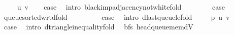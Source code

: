\begin{isabellebody}
\isamarkupfalse%
\isanewline
\ \ \isamarkupfalse%
\ {\isacharparenleft}{\kern0pt}{}\ u\ v{\isacharparenright}{\kern0pt}\isanewline
\ \ \isamarkupfalse%
\ {\isacharquery}{\kern0pt}case\ \isamarkupfalse%
\ {\isacharparenleft}{\kern0pt}intro\ black{\isacharunderscore}{\kern0pt}imp{\isacharunderscore}{\kern0pt}adjacency{\isacharunderscore}{\kern0pt}not{\isacharunderscore}{\kern0pt}white{\isacharunderscore}{\kern0pt}fold{\isacharparenright}{\kern0pt}\isanewline
{}\isamarkupfalse%
\isanewline
\ \ \isamarkupfalse%
\ {}\isanewline
\ \ \isamarkupfalse%
\ {\isacharquery}{\kern0pt}case\ \isamarkupfalse%
\ queue{\isacharunderscore}{\kern0pt}sorted{\isacharunderscore}{\kern0pt}wrt{\isacharunderscore}{\kern0pt}d{\isacharunderscore}{\kern0pt}fold\ \isacommand{{\isachardot}{\kern0pt}}\isamarkupfalse%
\isanewline
{}\isamarkupfalse%
\isanewline
\ \ \isamarkupfalse%
\ {}{}\isanewline
\ \ \isamarkupfalse%
\ {\isacharquery}{\kern0pt}case\ \isamarkupfalse%
\ {\isacharparenleft}{\kern0pt}intro\ d{\isacharunderscore}{\kern0pt}last{\isacharunderscore}{\kern0pt}queue{\isacharunderscore}{\kern0pt}le{\isacharunderscore}{\kern0pt}fold{\isacharparenright}{\kern0pt}\isanewline
{}\isamarkupfalse%
\isanewline
\ \ \isamarkupfalse%
\ {\isacharparenleft}{\kern0pt}{}{}\ p\ u\ v{\isacharparenright}{\kern0pt}\isanewline
\ \ \isamarkupfalse%
\ {\isacharquery}{\kern0pt}case\ \isamarkupfalse%
\ {\isacharparenleft}{\kern0pt}intro\ d{\isacharunderscore}{\kern0pt}triangle{\isacharunderscore}{\kern0pt}inequality{\isacharunderscore}{\kern0pt}fold{\isacharparenright}{\kern0pt}\isanewline
{}\isamarkupfalse%
%
\endisatagproof
{\isafoldproof}%
%
\isadelimproof
%
\endisadelimproof
%
\isadelimdocument
%
\endisadelimdocument
%
\isatagdocument
%
\isamarkuptrue%
%
\isamarkuptrue%
%
\endisatagdocument
{\isafolddocument}%
%
\isadelimdocument
%
\endisadelimdocument
{}\isamarkupfalse%
\ {\isacharparenleft}{\kern0pt}\ bfs{\isacharparenright}{\kern0pt}\ head{\isacharunderscore}{\kern0pt}queue{\isacharunderscore}{\kern0pt}mem{\isacharunderscore}{\kern0pt}dV{\isacharcolon}{\kern0pt}\isanewline

\end{isabellebody}
